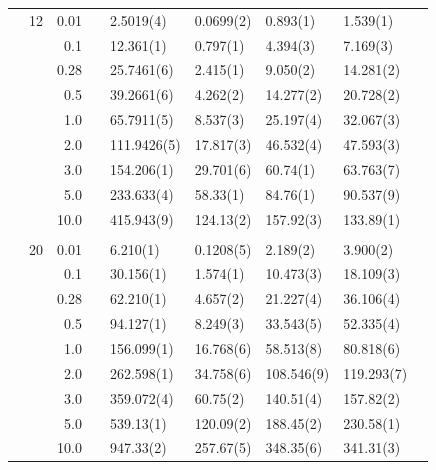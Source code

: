 \begin{table}[H]
\begin{tabularx}{\textwidth}{R{1cm}rrcR{2.3cm}R{2.3cm}R{2.3cm}R{2.3cm}R{1cm}}
		&12 & 0.01 && 2.5019(4) & 0.0699(2) & 0.893(1) & 1.539(1) \\
		&& 0.1 && 12.361(1) & 0.797(1) & 4.394(3) & 7.169(3) \\
		&& 0.28 && 25.7461(6) & 2.415(1) & 9.050(2) & 14.281(2) \\
		&& 0.5 && 39.2661(6) & 4.262(2) & 14.277(2) & 20.728(2) \\
		&& 1.0 && 65.7911(5) & 8.537(3) & 25.197(4) & 32.067(3) \\
		&& 2.0 && 111.9426(5) & 17.817(3) & 46.532(4) & 47.593(3) \\
		&& 3.0 && 154.206(1) & 29.701(6) & 60.74(1) & 63.763(7) \\ 
		&& 5.0 && 233.633(4) & 58.33(1) & 84.76(1) & 90.537(9) \\
		&& 10.0 && 415.943(9) & 124.13(2) & 157.92(3) & 133.89(1) \\
		\hdashline \\
		
		&20 & 0.01 && 6.210(1) & 0.1208(5) & 2.189(2) & 3.900(2) \\
		&& 0.1 && 30.156(1) & 1.574(1) & 10.473(3) & 18.109(3) \\
		&& 0.28 && 62.210(1) & 4.657(2) & 21.227(4) & 36.106(4) \\
		&& 0.5 && 94.127(1) & 8.249(3) & 33.543(5) & 52.335(4) \\
		&& 1.0 && 156.099(1) & 16.768(6) & 58.513(8) & 80.818(6) \\
		&& 2.0 && 262.598(1) & 34.758(6) & 108.546(9) & 119.293(7) \\
		&& 3.0 && 359.072(4) & 60.75(2) & 140.51(4) & 157.82(2) \\ 
		&& 5.0 && 539.13(1) & 120.09(2) & 188.45(2) & 230.58(1) \\
		&& 10.0 && 947.33(2) & 257.67(5) & 348.35(6) & 341.31(3) \\
		\hline \hline
	\end{tabularx}
\end{table} 
